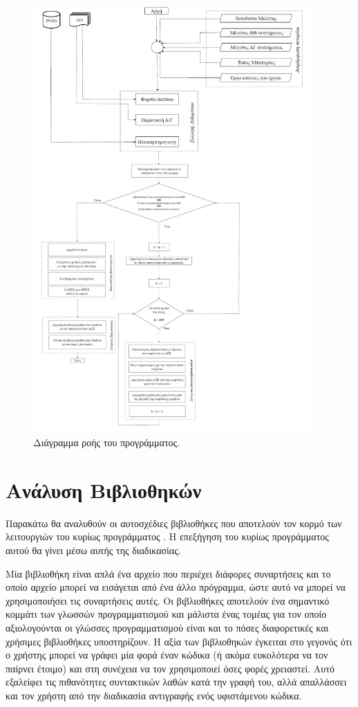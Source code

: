 \documentclass[12pt]{report}
\begin{document}
\begin{figure}[h]
				\center
				\includegraphics[width=0.95\textwidth]{flowchart}
				\captionsetup{width=0.8\textwidth}
				\caption{Διάγραμμα ροής του προγράμματος.}
				\label{fig:flowchart}
\end{figure}

\pagebreak
\section{Ανάλυση Βιβλιοθηκών}
Παρακάτω θα αναλυθούν οι αυτοσχέδιες βιβλιοθήκες που αποτελούν τον κορμό των λειτουργιών του κυρίως προγράμματος {}. Η επεξήγηση του κυρίως προγράμματος αυτού θα γίνει μέσω αυτής της διαδικασίας. 

Μία βιβλιοθήκη είναι απλά ένα αρχείο {} που περιέχει διάφορες συναρτήσεις και το οποίο αρχείο μπορεί να εισάγεται από ένα άλλο πρόγραμμα, ώστε αυτό να μπορεί να χρησιμοποιήσει τις συναρτήσεις αυτές. Οι βιβλιοθήκες 
αποτελούν ένα σημαντικό κομμάτι των γλωσσών προγραμματισμού και μάλιστα ένας τομέας για τον οποίο αξιολογούνται οι γλώσσες προγραμματισμού είναι και το πόσες διαφορετικές και χρήσιμες βιβλιοθήκες υποστηρίζουν. Η αξία των βιβλιοθηκών
έγκειται στο γεγονός ότι ο χρήστης μπορεί να γράφει μία φορά έναν κώδικα (ή ακόμα ευκολότερα να τον παίρνει έτοιμο) και στη συνέχεια να τον χρησιμοποιεί όσες φορές χρειαστεί. Αυτό εξαλείφει τις πιθανότητες συντακτικών λαθών κατά την
γραφή του, αλλά απαλλάσσει και τον χρήστη από την διαδικασία αντιγραφής ενός υφιστάμενου κώδικα. 
\end{document}
